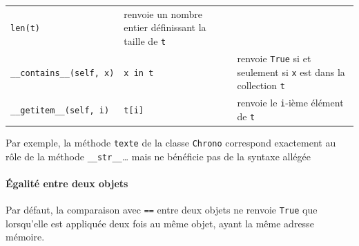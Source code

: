 \documentclass[a4paper,17pt]{extarticle}
\begin{document}
\begin{longtable}[]{@{}lll@{}}
\begin{minipage}[t]{0.30\columnwidth}
\texttt{len(t)}\strut
\end{minipage} & \begin{minipage}[t]{0.30\columnwidth}\raggedright
renvoie un nombre entier définissant la taille de \texttt{t}\strut
\end{minipage}\tabularnewline
\begin{minipage}[t]{0.30\columnwidth}\raggedright
\texttt{\_\_contains\_\_(self,\ x)}\strut
\end{minipage} & \begin{minipage}[t]{0.30\columnwidth}\raggedright
\texttt{x\ in\ t}\strut
\end{minipage} & \begin{minipage}[t]{0.30\columnwidth}\raggedright
renvoie \texttt{True} si et seulement si \texttt{x} est dans la
collection \texttt{t}\strut
\end{minipage}\tabularnewline
\begin{minipage}[t]{0.30\columnwidth}\raggedright
\texttt{\_\_getitem\_\_(self,\ i)}\strut
\end{minipage} & \begin{minipage}[t]{0.30\columnwidth}\raggedright
\texttt{t{[}i{]}}\strut
\end{minipage} & \begin{minipage}[t]{0.30\columnwidth}\raggedright
renvoie le \texttt{i}-ième élément de \texttt{t}\strut
\end{minipage}\tabularnewline
\bottomrule
\end{longtable}
\begin{exemple}
    Par exemple, la méthode \texttt{texte} de la classe \texttt{Chrono}
correspond exactement au rôle de la méthode \texttt{\_\_str\_\_}\ldots{}
mais ne bénéficie pas de la syntaxe allégée

        \end{exemple}
    \hypertarget{uxe9galituxe9-entre-deux-objets}{%
\paragraph{Égalité entre deux
objets}\label{uxe9galituxe9-entre-deux-objets}}

Par défaut, la comparaison avec \texttt{==} entre deux objets ne renvoie
\texttt{True} que lorsqu'elle est appliquée deux fois au même objet,
ayant la même adresse mémoire.
\end{document}
